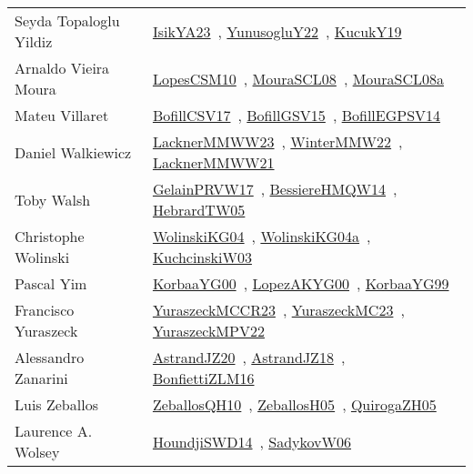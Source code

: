 {\begin{longtable}{p{4cm}p{20cm}}
Seyda Topaloglu Yildiz & \href{articles/IsikYA23.pdf}{IsikYA23}~\cite{IsikYA23}, \href{}{YunusogluY22}~\cite{YunusogluY22}, \href{}{KucukY19}~\cite{KucukY19}\\
Arnaldo Vieira Moura & \href{articles/LopesCSM10.pdf}{LopesCSM10}~\cite{LopesCSM10}, \href{papers/MouraSCL08.pdf}{MouraSCL08}~\cite{MouraSCL08}, \href{papers/MouraSCL08a.pdf}{MouraSCL08a}~\cite{MouraSCL08a}\\
Mateu Villaret & \href{papers/BofillCSV17.pdf}{BofillCSV17}~\cite{BofillCSV17}, \href{papers/BofillGSV15.pdf}{BofillGSV15}~\cite{BofillGSV15}, \href{papers/BofillEGPSV14.pdf}{BofillEGPSV14}~\cite{BofillEGPSV14}\\
Daniel Walkiewicz & \href{articles/LacknerMMWW23.pdf}{LacknerMMWW23}~\cite{LacknerMMWW23}, \href{papers/WinterMMW22.pdf}{WinterMMW22}~\cite{WinterMMW22}, \href{papers/LacknerMMWW21.pdf}{LacknerMMWW21}~\cite{LacknerMMWW21}\\
Toby Walsh & \href{papers/GelainPRVW17.pdf}{GelainPRVW17}~\cite{GelainPRVW17}, \href{papers/BessiereHMQW14.pdf}{BessiereHMQW14}~\cite{BessiereHMQW14}, \href{papers/HebrardTW05.pdf}{HebrardTW05}~\cite{HebrardTW05}\\
Christophe Wolinski & \href{papers/WolinskiKG04.pdf}{WolinskiKG04}~\cite{WolinskiKG04}, \href{}{WolinskiKG04a}~\cite{WolinskiKG04a}, \href{articles/KuchcinskiW03.pdf}{KuchcinskiW03}~\cite{KuchcinskiW03}\\
Pascal Yim & \href{articles/KorbaaYG00.pdf}{KorbaaYG00}~\cite{KorbaaYG00}, \href{articles/LopezAKYG00.pdf}{LopezAKYG00}~\cite{LopezAKYG00}, \href{papers/KorbaaYG99.pdf}{KorbaaYG99}~\cite{KorbaaYG99}\\
Francisco Yuraszeck & \href{articles/YuraszeckMCCR23.pdf}{YuraszeckMCCR23}~\cite{YuraszeckMCCR23}, \href{papers/YuraszeckMC23.pdf}{YuraszeckMC23}~\cite{YuraszeckMC23}, \href{articles/YuraszeckMPV22.pdf}{YuraszeckMPV22}~\cite{YuraszeckMPV22}\\
Alessandro Zanarini & \href{articles/AstrandJZ20.pdf}{AstrandJZ20}~\cite{AstrandJZ20}, \href{papers/AstrandJZ18.pdf}{AstrandJZ18}~\cite{AstrandJZ18}, \href{papers/BonfiettiZLM16.pdf}{BonfiettiZLM16}~\cite{BonfiettiZLM16}\\
Luis Zeballos & \href{articles/ZeballosQH10.pdf}{ZeballosQH10}~\cite{ZeballosQH10}, \href{articles/ZeballosH05.pdf}{ZeballosH05}~\cite{ZeballosH05}, \href{papers/QuirogaZH05.pdf}{QuirogaZH05}~\cite{QuirogaZH05}\\
Laurence A. Wolsey & \href{papers/HoundjiSWD14.pdf}{HoundjiSWD14}~\cite{HoundjiSWD14}, \href{}{SadykovW06}~\cite{SadykovW06}\\

\end{longtable}}
